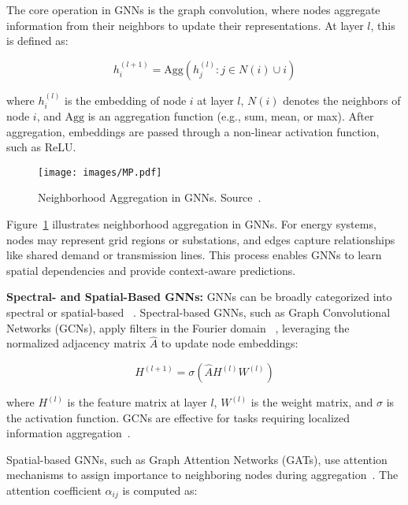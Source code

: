 \documentclass[sigconf,nonacm]{acmart}
\begin{document}
The core operation in GNNs is the graph convolution, where nodes aggregate information from their neighbors to update their representations. At layer $l$, this is defined as:

\begin{equation} h_i^{(l+1)} = \text{Agg}\left({h_j^{(l)} : j \in N(i) \cup {i}}\right) \label{eq:graph_convolution} \end{equation}

where $h_i^{(l)}$ is the embedding of node $i$ at layer $l$, $N(i)$ denotes the neighbors of node $i$, and $\text{Agg}$ is an aggregation function (e.g., sum, mean, or max). After aggregation, embeddings are passed through a non-linear activation function, such as ReLU.

\begin{figure}[h!]
    \centering
    \texttt{[image: images/MP.pdf]}
    \caption{ Neighborhood Aggregation in GNNs. Source~\cite{Jin2022GNNLens}.}
    \label{fig:gnn_architecture}
\end{figure}

Figure~\ref{fig:gnn_architecture} illustrates neighborhood aggregation in GNNs. For energy systems, nodes may represent grid regions or substations, and edges capture relationships like shared demand or transmission lines. This process enables GNNs to learn spatial dependencies and provide context-aware predictions.

\textbf{Spectral- and Spatial-Based GNNs:} GNNs can be broadly categorized into spectral or spatial-based ~\cite{Bruna2013, Henaff2015, Chiang2019, Hamilton2017, velivckovic2017}. Spectral-based GNNs, such as Graph Convolutional Networks (GCNs), apply filters in the Fourier domain ~\cite{kipf2016,yao2019,cao2022}, leveraging the normalized adjacency matrix $\hat{A}$ to update node embeddings:

\begin{equation} H^{(l+1)} = \sigma(\hat{A} H^{(l)} W^{(l)}) \label{eq:gcn_update} \end{equation}

where $H^{(l)}$ is the feature matrix at layer $l$, $W^{(l)}$ is the weight matrix, and $\sigma$ is the activation function. GCNs are effective for tasks requiring localized information aggregation~\cite{Liao2021,Mansoor2024}.

Spatial-based GNNs, such as Graph Attention Networks (GATs), use attention mechanisms to assign importance to neighboring nodes during aggregation~\cite{bahdanau2014,gehring2016}. The attention coefficient $\alpha_{ij}$ is computed as:
\end{document}
